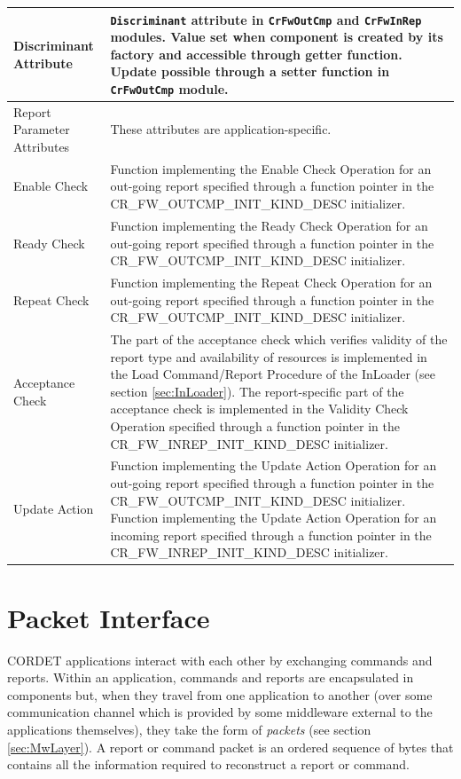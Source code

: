 \documentclass[a4paper,10pt]{article}
\let\stdsection\section
\renewcommand\section{\newpage\stdsection}
\begin{document}
\begin{longtable}{|>{\raggedright}p{2.0cm}|p{9.3cm}|}
\hline
Discriminant Attribute & \texttt{Discriminant} attribute in \texttt{CrFwOutCmp} and \texttt{CrFwInRep} modules. Value set when component is created by its factory and accessible through getter function. Update possible through a setter function in \texttt{CrFwOutCmp} module. \\
\hline
Report Parameter Attributes & These attributes are application-specific.  \\
\hline
Enable Check & Function implementing the Enable Check Operation for an out-going report specified through a function pointer in the CR\_FW\_OUTCMP\_INIT\_KIND\_DESC initializer.  \\
\hline
Ready Check & Function implementing the Ready Check Operation for an out-going report specified through a function pointer in the CR\_FW\_OUTCMP\_INIT\_KIND\_DESC initializer. \\
\hline
Repeat Check & Function implementing the Repeat Check Operation for an out-going report specified through a function pointer in the CR\_FW\_OUTCMP\_INIT\_KIND\_DESC initializer.  \\
\hline
Acceptance Check & The part of the acceptance check which verifies validity of the report type and availability of resources is implemented in the Load Command/Report Procedure of the InLoader (see section \ref{sec:InLoader}). The report-specific part of the acceptance check is implemented in the Validity Check Operation specified through a function pointer in the CR\_FW\_INREP\_INIT\_KIND\_DESC initializer.  \\
\hline
Update Action & Function implementing the Update Action Operation for an out-going report specified through a function pointer in the CR\_FW\_OUTCMP\_INIT\_KIND\_DESC initializer. Function implementing the Update Action Operation for an incoming report specified through a function pointer in the CR\_FW\_INREP\_INIT\_KIND\_DESC initializer. \\
\hline
\end{longtable}




\section{Packet Interface}\label{sec:PcktInterface}
CORDET applications interact with each other by exchanging commands and reports. Within an application, commands and reports are encapsulated in components but, when they travel from one application to another (over some communication channel which is provided by some middleware external to the applications themselves), they take the form of \textit{packets} (see section \ref{sec:MwLayer}). A report or command packet is an ordered sequence of bytes that contains all the information required to reconstruct a report or command. 
\end{document}
